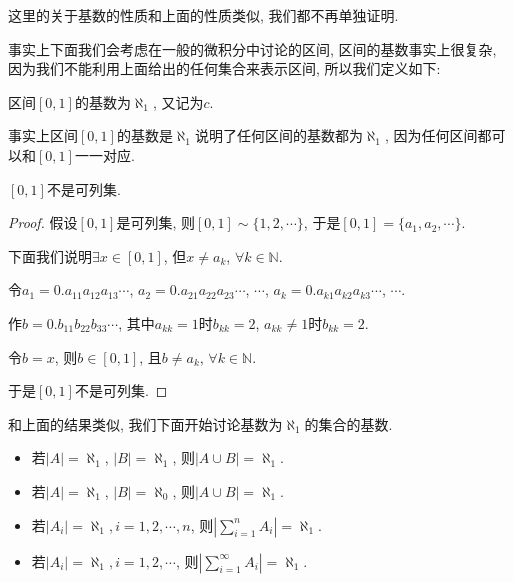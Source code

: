 \documentclass[theorem=false,mathfont=none,openany,sub3section]{easybook}
\begin{document}
\begin{remark}
  这里的关于基数的性质和上面的性质类似, 我们都不再单独证明.\par
\end{remark}

事实上下面我们会考虑在一般的微积分中讨论的区间, 区间的基数事实上很复杂, 因为我们不能利用上面给出的任何集合来表示区间, 所以我们定义如下:\par

\begin{definition}
  区间$[0,1]$的基数为$\aleph_{1}$, 又记为$c$.\par
\end{definition}

\begin{remark}
  事实上区间$[0,1]$的基数是$\aleph_{1}$说明了任何区间的基数都为$\aleph_{1}$, 因为任何区间都可以和$[0,1]$一一对应.\par
\end{remark}

\begin{theorem}
  $[0,1]$不是可列集.\par
\end{theorem}

\begin{proof}
  假设$[0,1]$是可列集, 则$[0,1]\sim \{1,2,\cdots\}$, 于是$[0,1]=\{a_1,a_2,\cdots\}$.\par
  下面我们说明$\exists x \in [0,1]$, 但$x\ne a_k$, $\forall k\in \mathbb{N}$.\par
  令$a_1=0.a_{11}a_{12}a_{13}\cdots$, $a_2=0.a_{21}a_{22}a_{23}\cdots$, $\cdots$, $a_k=0.a_{k1}a_{k2}a_{k3}\cdots$, $\cdots$.\par
  作$b=0.b_{11}b_{22}b_{33}\cdots$, 其中$a_{kk}=1$时$b_{kk}=2$, $a_{kk}\ne 1$时$b_{kk}=2$.\par
  令$b=x$, 则$b\in [0,1]$, 且$b\ne a_k$, $\forall k\in \mathbb{N}$.\par
  于是$[0,1]$不是可列集.\par
\end{proof}

和上面的结果类似, 我们下面开始讨论基数为$\aleph_{1}$的集合的基数.\par

\begin{proposition}
  \begin{itemize}
    \item 若$|A|=\aleph_{1}$, $|B|=\aleph_{1}$, 则$|A\cup B|=\aleph_{1}$.
    \item 若$|A|=\aleph_{1}$, $|B|=\aleph_{0}$, 则$|A\cup B|=\aleph_{1}$.
    \item 若$|A_i|=\aleph_{1}, i =1,2,\cdots, n$, 则$|\sum_{i=1}^{n}A_i|=\aleph_{1}$.
    \item 若$|A_i|=\aleph_{1}, i =1,2,\cdots$, 则$|\sum_{i=1}^{\infty}A_i|=\aleph_{1}$.
  \end{itemize}
\end{proposition}
\end{document}
